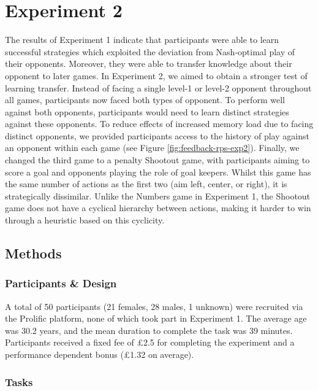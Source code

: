 \documentclass[smallextended]{svjour3}       %
\begin{document}
\hypertarget{experiment-2}{%
\section{Experiment 2}\label{experiment-2}}

The results of Experiment 1 indicate that participants were able to
learn successful strategies which exploited the deviation from
Nash-optimal play of their opponents. Moreover, they were able to
transfer knowledge about their opponent to later games. In Experiment 2,
we aimed to obtain a stronger test of learning transfer. Instead of
facing a single level-1 or level-2 opponent throughout all games,
participants now faced both types of opponent. To perform well against
both opponents, participants would need to learn distinct strategies
against these opponents. To reduce effects of increased memory load due
to facing distinct opponents, we provided participants access to the
history of play against an opponent within each game (see Figure
\ref{fig:feedback-rps-exp2}). Finally, we changed the third game to a
penalty Shootout game, with participants aiming to score a goal and
opponents playing the role of goal keepers. Whilst this game has the
same number of actions as the first two (aim left, center, or right), it
is strategically dissimilar. Unlike the Numbers game in Experiment 1,
the Shootout game does not have a cyclical hierarchy between actions,
making it harder to win through a heuristic based on this cyclicity.

\hypertarget{methods-1}{%
\subsection{Methods}\label{methods-1}}

\hypertarget{participants-design}{%
\subsubsection{Participants \& Design}\label{participants-design}}

A total of 50 participants (21 females, 28 males, 1 unknown) were
recruited via the Prolific platform, none of which took part in
Experiment 1. The average age was 30.2 years, and the mean duration to
complete the task was 39 minutes. Participants received a fixed fee of
£2.5 for completing the experiment and a performance dependent bonus
(£1.32 on average).

\hypertarget{tasks-1}{%
\subsubsection{Tasks}\label{tasks-1}}
\end{document}
